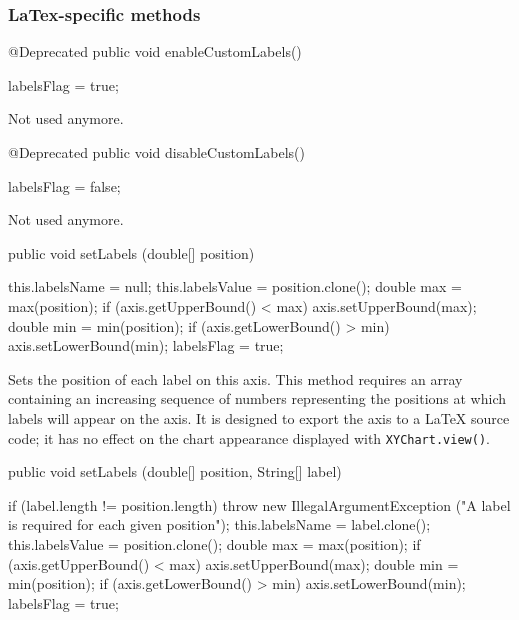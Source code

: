 \subsubsection*{LaTex-specific methods}

\begin{code}

   @Deprecated
   public void enableCustomLabels() \begin{hide} {
      labelsFlag = true;
   }\end{hide}
\end{code}
\begin{tabb}
Not used anymore.
\end{tabb}
\begin{code}

   @Deprecated
   public void disableCustomLabels() \begin{hide} {
      labelsFlag = false;
   }\end{hide}
\end{code}
\begin{tabb}
Not used anymore.
\end{tabb}
\begin{code}

   public void setLabels (double[] position) \begin{hide} {
      this.labelsName = null;
      this.labelsValue = position.clone();
      double max = max(position);
      if (axis.getUpperBound() < max)
         axis.setUpperBound(max);
      double min = min(position);
      if (axis.getLowerBound() > min)
         axis.setLowerBound(min);
      labelsFlag = true;
   }\end{hide}
\end{code}
\begin{tabb}
Sets the position of each label on this axis. This method requires an array
containing an increasing sequence of numbers representing the positions at
 which labels will appear on the axis. It is designed to export the
 axis to a LaTeX source code; it has no effect on the chart appearance
 displayed with \texttt{XYChart.view()}.
\end{tabb}
\begin{htmlonly}
\end{htmlonly}
\begin{code}

   public void setLabels (double[] position, String[] label) \begin{hide} {
      if (label.length != position.length)
         throw new IllegalArgumentException
            ("A label is required for each given position");
      this.labelsName = label.clone();
      this.labelsValue = position.clone();
      double max = max(position);
      if (axis.getUpperBound() < max)
         axis.setUpperBound(max);
      double min = min(position);
      if (axis.getLowerBound() > min)
         axis.setLowerBound(min);
      labelsFlag = true;
   }\end{hide}
\end{code}
